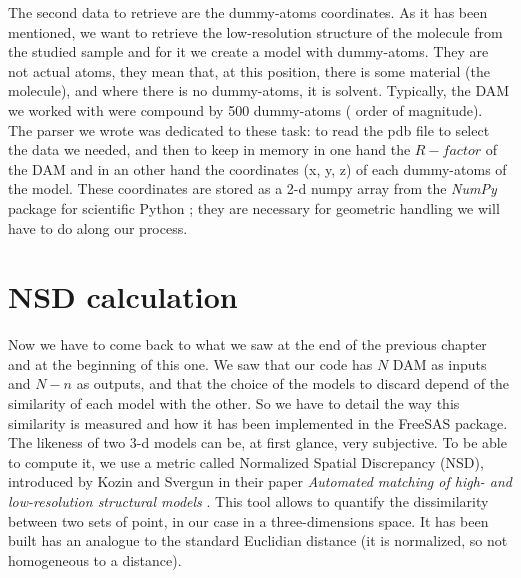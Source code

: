\documentclass[a4paper, 11pt]{report}
\begin{document}
The second data to retrieve are the dummy-atoms coordinates. 
As it has been mentioned, we want to retrieve the low-resolution 
structure of the molecule from the studied sample and for it we create 
a model with dummy-atoms. 
They are not actual atoms, they mean that, at this position, there is 
some material (the molecule), and where there is no dummy-atoms, it is 
solvent. 
Typically, the DAM we worked with were compound by 500 dummy-atoms (
order of magnitude).\\
The parser we wrote was dedicated to these task: to read the pdb file 
to select the data we needed, and then to keep in memory in one hand 
the $R-factor$ of the DAM and in an other hand the coordinates (x, y, 
z) of each dummy-atoms of the model. 
These coordinates are stored as a 2-d numpy array from the 
\textit{NumPy} package for scientific Python \cite{numpy}; they are 
necessary for geometric handling we will have to do along our process.

\section{NSD calculation}

Now we have to come back to what we saw at the end of the previous 
chapter and at the beginning of this one. 
We saw that our code has $N$ DAM as inputs and $N - n$ as outputs, and 
that the choice of the models to discard depend of the similarity of 
each model with the other. 
So we have to detail the way this similarity is measured and how it 
has been implemented in the FreeSAS package.\\

The likeness of two 3-d models can be, at first glance, very 
subjective. 
To be able to compute it, we use a metric called Normalized Spatial 
Discrepancy (NSD), introduced by Kozin and Svergun in their paper 
\textit{Automated matching of high- and low-resolution structural 
models} \cite{supcomb}. 
This tool allows to quantify the dissimilarity between two sets of 
point, in our case in a three-dimensions space. 
It has been built has an analogue to the standard Euclidian distance 
(it is normalized, so not homogeneous to a distance).\\
\end{document}
